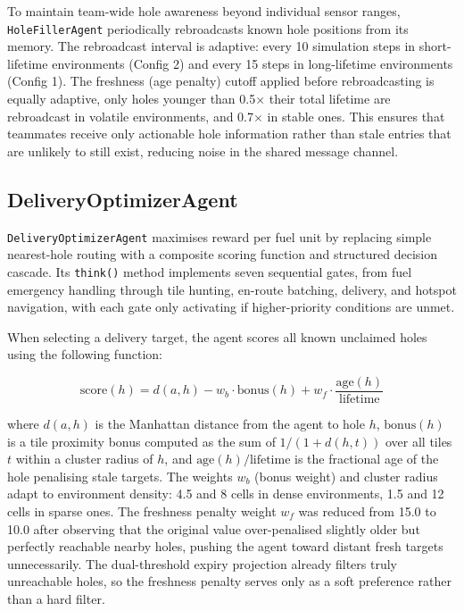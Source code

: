 \documentclass[letterpaper]{article}
\begin{document}
To maintain team-wide hole awareness beyond individual sensor ranges,
\texttt{HoleFillerAgent} periodically rebroadcasts known hole positions from its
memory. The rebroadcast interval is adaptive: every 10 simulation steps in
short-lifetime environments (Config 2) and every 15 steps in long-lifetime
environments (Config 1). The freshness (age penalty) cutoff applied before rebroadcasting is
equally adaptive, only holes younger than 0.5$\times$ their total lifetime
are rebroadcast in volatile environments, and 0.7$\times$ in stable ones. This
ensures that teammates receive only actionable hole information rather than stale
entries that are unlikely to still exist, reducing noise in the shared message
channel.

\subsection{DeliveryOptimizerAgent}

\texttt{DeliveryOptimizerAgent} maximises reward per fuel unit by replacing
simple nearest-hole routing with a composite scoring function and structured
decision cascade. Its \texttt{think()} method implements seven sequential gates,
from fuel emergency handling through tile hunting, en-route batching, delivery,
and hotspot navigation, with each gate only activating if higher-priority
conditions are unmet.

When selecting a delivery target, the agent scores all known unclaimed holes
using the following function:

\begin{equation}
\text{score}(h) = d(a, h) - w_b \cdot \text{bonus}(h) + w_f \cdot
\frac{\text{age}(h)}{\text{lifetime}}
\end{equation}

\noindent where $d(a, h)$ is the Manhattan distance from the agent to hole $h$,
$\text{bonus}(h)$ is a tile proximity bonus computed as the sum of
$1/(1 + d(h, t))$ over all tiles $t$ within a cluster radius of $h$, and
$\text{age}(h)/\text{lifetime}$ is the fractional age of the hole penalising
stale targets. The weights $w_b$ (bonus weight) and cluster radius adapt to
environment density: 4.5 and 8 cells in dense environments, 1.5 and 12 cells in
sparse ones. The freshness penalty weight $w_f$ was reduced from 15.0 to 10.0
after observing that the original value over-penalised slightly older but
perfectly reachable nearby holes, pushing the agent toward distant fresh targets
unnecessarily. The dual-threshold expiry projection already filters truly
unreachable holes, so the freshness penalty serves only as a soft preference
rather than a hard filter.
\end{document}
